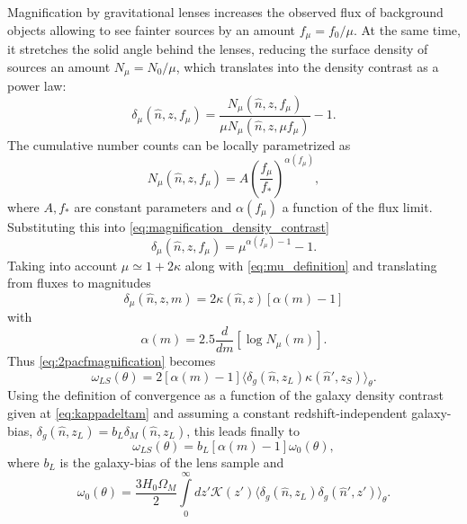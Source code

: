Magnification by gravitational lenses increases the observed flux of background objects  allowing to see fainter sources by an amount $f_\mu = f_0/\mu$. At the same time, it stretches the solid angle behind the lenses, reducing the surface density of sources an amount $N_\mu = N_0/\mu$, which translates into the density contrast as a power law:
\begin{equation}
\delta_\mu(\hat n,z,f_\mu) = \frac{N_\mu(\hat n,z,f_\mu)}{\mu N_\mu(\hat n,z,\mu f_\mu)}-1.
\label{eq:magnification_density_contrast}
\end{equation}
The cumulative number counts can be locally parametrized as
\begin{equation}
N_\mu(\hat n,z,f_\mu) = A\left(\frac{f_\mu}{f_*}\right)^{\alpha(f_\mu)},
\end{equation}
where $A,f_*$ are constant parameters and $\alpha(f_\mu)$ a function of the flux limit. Substituting this into \autoref{eq:magnification_density_contrast}
\begin{equation}
\delta_\mu(\hat n,z,f_\mu) = \mu^{\alpha(f_\mu)-1}-1.
\end{equation}
Taking into account $\mu\simeq 1+2\kappa$ along with \autoref{eq:mu_definition} and translating from fluxes to magnitudes
\begin{equation}
\delta_\mu(\hat n,z,m) = 2\kappa(\hat n,z)[\alpha(m)-1]
\end{equation}
with
\begin{equation}
\alpha(m) = 2.5\frac{d}{dm}\left[\log N_\mu(m)\right].
\end{equation}
Thus \autoref{eq:2pacfmagnification} becomes
\begin{equation}
\omega_{LS}(\theta) = 2[\alpha(m)-1]\langle\delta_g(\hat n,z_L)\kappa(\hat n',z_S)\rangle_\theta.
\end{equation}
Using the definition of  convergence as a function of the galaxy density contrast given at \autoref{eq:kappadeltam} and assuming a constant redshift-independent galaxy-bias, $\delta_g(\hat n,z_L) = b_L\delta_M(\hat n,z_L)$, this leads finally to
\begin{equation}
\omega_{LS}(\theta) = b_L[\alpha(m)-1]\omega_0(\theta),
\end{equation}
where $b_L$ is the galaxy-bias of the lens sample and
\begin{equation}
\omega_0(\theta) = \frac{3H_0\Omega_M}{2}\int\limits_0^\infty dz'\mathcal{K}(z')\langle\delta_g(\hat n,z_L)\delta_g(\hat n',z')\rangle_\theta.
\label{eq:omega0}
\end{equation}


